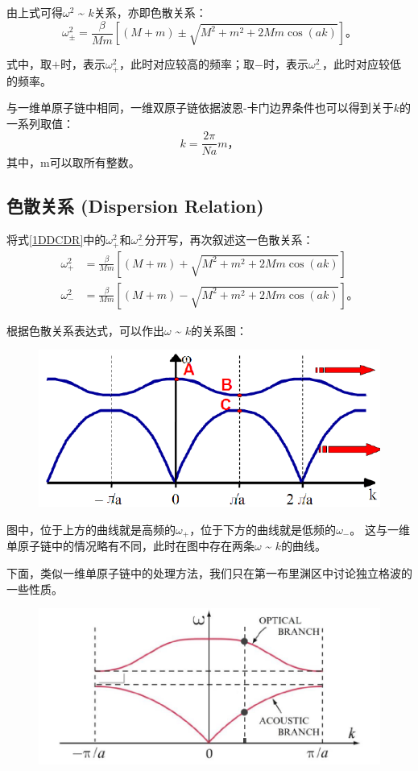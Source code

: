 \documentclass[declarePage]{ecnuthesis}
\begin{document}
由上式可得$\omega^2$ \~{} $k$关系，亦即色散关系：
\begin{equation}
    \omega^2_\pm=\frac{\beta}{Mm}[(M+m)\pm\sqrt{M^2+m^2+2Mm\cos(ak)}] \text{。} \label{1DDCDR}
\end{equation}

式中，取$+$时，表示$\omega_+^2$，此时对应较高的频率；取$-$时，表示$\omega_-^2$，此时对应较低的频率。

与一维单原子链中相同，一维双原子链依据波恩-卡门边界条件也可以得到关于$k$的一系列取值：
\begin{equation}
    k = \frac{2\pi}{Na}m \text{，} \label{1DDCK}
\end{equation}
其中，m可以取所有整数。

\subsection{色散关系 (Dispersion Relation)}

将式\ref{1DDCDR}中的$\omega_+^2$和$\omega_-^2$分开写，再次叙述这一色散关系：
\begin{align}
    \omega^2_+&=\frac{\beta}{Mm}[(M+m)+\sqrt{M^2+m^2+2Mm\cos(ak)}]\\
    \omega^2_-&=\frac{\beta}{Mm}[(M+m)-\sqrt{M^2+m^2+2Mm\cos(ak)}] \text{。}
\end{align}

根据色散关系表达式，可以作出$\omega$ \~{} $k$的关系图：
\begin{figure}[htb]
    \centering
    \includegraphics[width=.4\textwidth]{1DDCDR.png}
\end{figure}

图中，位于上方的曲线就是高频的$\omega_+$，位于下方的曲线就是低频的$\omega_-$。%
这与一维单原子链中的情况略有不同，此时在图中存在两条$\omega$ \~{} $k$的曲线。

下面，类似一维单原子链中的处理方法，我们只在第一布里渊区中讨论独立格波的一些性质。
\begin{figure}[htb]
    \centering
    \includegraphics[width=.7\textwidth]{1DDCDR1.png}
     \label{1DDCDR1}
\end{figure}
\end{document}
